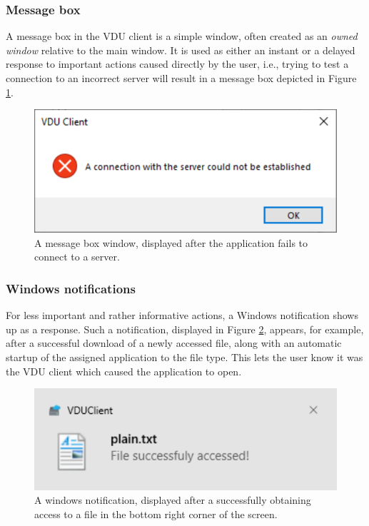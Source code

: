\subsubsection{Message box}
A message box in the VDU client is a simple window, often created as an \textit{owned window} relative to the main window. It is used as either an instant or a delayed response to important actions caused directly by the user, i.e., trying to test a connection to an incorrect server will result in a message box depicted in Figure \ref{messageboxex}. 

\begin{figure}[htb]
    \centering
	\includegraphics[]{obrazky-figures/messageboxex.pdf}
	\caption{A message box window, displayed after the application fails to connect to a server.}
	\label{messageboxex}
\end{figure}

\subsubsection{Windows notifications}
For less important and rather informative actions, a Windows notification shows up as a response. Such a notification, displayed in Figure \ref{notificationex}, appears, for example, after a successful download of a newly accessed file, along with an automatic startup of the assigned application to the file type. This lets the user know it was the VDU client which caused the application to open.
\begin{figure}[htb]
    \centering
	\includegraphics[]{obrazky-figures/notificationex.pdf}
	\caption{A windows notification, displayed after a successfully obtaining access to a file in the bottom right corner of the screen.}
	\label{notificationex}
\end{figure}

